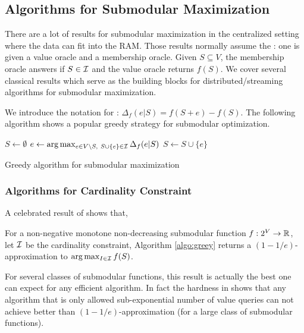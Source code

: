 \subsection{Algorithms for Submodular Maximization}
There are a lot of results for submodular maximization in the centralized setting where the data can fit into the RAM. Those results normally assume the : one is given a value oracle and a membership oracle. Given $S\subseteq V$, the membership oracle answers if $S \in \mathcal{I}$ and the value oracle returns $f(S)$. We cover several classical results which serve as the building blocks for distributed/streaming algorithms for submodular maximization.

We introduce the notation for : $\Delta_f(e|S) = f(S + e) - f(S)$. The following algorithm shows a popular greedy strategy for submodular optimization.

\begin{algorithm}[H]
\DontPrintSemicolon %
$S \gets \emptyset$\;
 {
  $e \gets \arg\max_{e\in V\backslash S, ~S\cup\{e\}\in \mathcal{I}} \Delta_f(e|S)$\;\label{line:emax}
  $S \gets S\cup \{e\}$\;
}
\;
\caption{{\sc Greedy} algorithm for submodular maximization}
\label{algo:greey}
\end{algorithm}


\subsubsection{Algorithms for Cardinality Constraint}


A celebrated result of \cite{NWF78} shows that,
\begin{theorem}
  \label{thm:1978}
  For a non-negative monotone non-decreasing submodular function $f: 2^V \rightarrow \mathbb{R}$, let $\mathcal{I}$ be the cardinality constraint, Algorithm \ref{algo:greey} returns a $(1 - 1/e)$-approximation to $\arg\max_{I\in \mathcal{I}} f(S)$.
\end{theorem}
For several classes of submodular functions, this result is actually the best one can expect for any efficient algorithm. In fact the hardness in \cite{NWF78,F98} shows that any algorithm that is only allowed sub-exponential number of value queries can not achieve better than $(1 - 1/e)$-approximation (for a large class of submodular functions).

